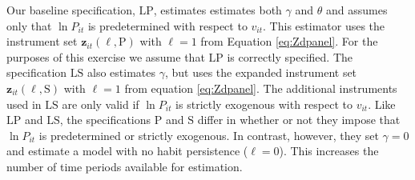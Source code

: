 Our baseline specification, $\text{LP}$, estimates estimates both $\gamma$ and $\theta$ and assumes only that $\ln P_{it}$ is predetermined with respect to $v_{it}$. 
This estimator uses the instrument set $\mathbf{z}_{it}(\ell, \text{P})$ with $\ell = 1$ from Equation \ref{eq:Zdpanel}.
For the purposes of this exercise we assume that $\text{LP}$ is correctly specified.
The specification $\text{LS}$ also estimates $\gamma$, but uses the expanded instrument set $\mathbf{z}_{it}(\ell, \text{S})$ with $\ell=1$ from equation \ref{eq:Zdpanel}.
The additional instruments used in $\text{LS}$ are only valid if $\ln P_{it}$ is strictly exogenous with respect to $v_{it}$.
Like $\text{LP}$ and $\text{LS}$, the specifications $\text{P}$ and $\text{S}$ differ in whether or not they impose that $\ln P_{it}$ is predetermined or strictly exogenous.
In contrast, however, they set $\gamma = 0$ and estimate a model with no habit persistence ($\ell =0$).
This increases the number of time periods available for estimation.


